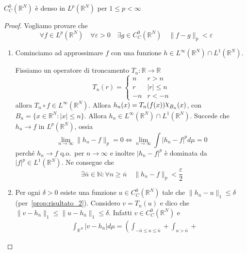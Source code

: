 \begin{proposition}\label{thm:risultato_3}
    \(C_C^{0}{(\mathbb{R}^{N})}\) è denso in \(L^p(\mathbb{R}^{N})\) per \(1 \le p < \infty\)
\end{proposition}
\begin{proof}
    Vogliamo provare che
    \[
        \forall f \in L^p(\mathbb{R}^{N}) \quad \forall \varepsilon > 0 \quad \exists g \in C_C^{0}{(\mathbb{R}^{N})} \quad \|f - g\|_p < \varepsilon
    \]
\begin{enumerate}[label = \arabic*.]
    \item Cominciamo ad approssimare \(f\) con una funzione \(h \in
        L^{\infty}{(\mathbb{R}^{N})} \cap L^{1}{(\mathbb{R}^{N})}\).

        Fissiamo un operatore di troncamento \(T_{n} : \mathbb{R} \to \mathbb{R}\) 
        \[
            T_{n}{(r)} = \begin{cases}
                n & r > n \\
                r & |r| \le  n \\
                -n & r < -n
            \end{cases}
        \]
        allora \(T_{n}\circ f \in L^{\infty}{(\mathbb{R}^{N})}\). Allora \(h_{n}
        {(x)} = T_{n}{(f{(x)})}\rchi_{B_{n}} {(x)}\), 
        con \(B_{n} = \{x \in \mathbb{R}^{N}: |x| \le n\}\). Allora \(h_{n} \in
        L^\infty(\mathbb{R}^{N}) \cap L^1(\mathbb{R}^{N})\). Succede che \(h_{n}
        \to f\) in \(L^p(\mathbb{R}^{N})\), ossia 
        \[
            \lim_{n\to \infty} \|h_{n} - f\|_p = 0 \iff \lim_{n\to \infty} \int |h_{n} - f|^p d\mu = 0
        \]
        perché \(h_{n} \to f\) q.o.~per \(n \to \infty\) e inoltre \(|h_{n}
        -f|^{p}\) è dominata da \(|f|^{p} \in L^{1}{(\mathbb{R}^{N})}\). Ne
        consegue che 
        \[
            \exists \overline{n} \in \mathbb{N} : \forall n \ge \overline{n} \quad \|h_{n} - f\|_p < \frac{\varepsilon}{2}
        \]
    \item Per ogni \(\delta > 0\) esiste una funzione \(u \in
        C^{0}_C{(\mathbb{R}^{N})}\) tale che \(\|h_{\overline{n}} - u\|_1 \le 
        \delta\) (per~\ref{prop:risultato_2}). Considero \(v = T_{n}(u)\) e dico
        che \(\|v - h_{\overline{n}}\|_1 \le \|u - h_{\overline{n}} \|_1 \le
        \delta\).
        Infatti \(v \in C^{0}_C{(\mathbb{R}^{N})}\) e
        \begin{align*}
            &\int_{\mathbb{R}^{N}} | v- h_{\overline{n}} | d\mu =
            \left(\int_{-\overline{n} \le u \le  \overline{n}} + 
            \int_{u > \overline{n}} +

\end{align*}
\end{enumerate}
\end{proof}

